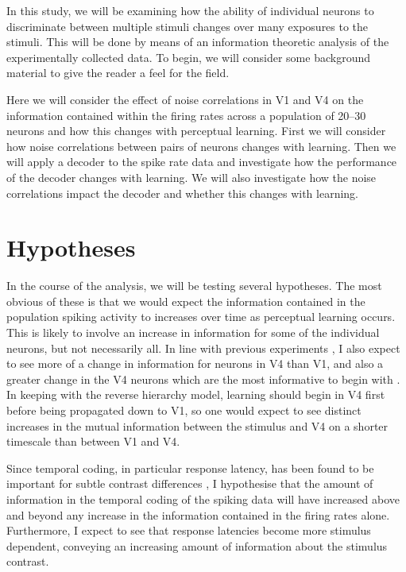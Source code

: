 In this study, we will be examining how the ability of individual neurons to discriminate between multiple stimuli changes over many exposures to the stimuli.
This will be done by means of an information theoretic analysis of the experimentally collected data.
To begin, we will consider some background material to give the reader a feel for the field.

Here we will consider the effect of noise correlations in \ac{V1} and \ac{V4} on the information contained within the firing rates across a population of 20--30 neurons and how this changes with perceptual learning.
First we will consider how noise correlations between pairs of neurons changes with learning.
Then we will apply a decoder to the spike rate data and investigate how the performance of the decoder changes with learning.
We will also investigate how the noise correlations impact the decoder and whether this changes with learning.


\section{Hypotheses}

In the course of the analysis, we will be testing several hypotheses.
The most obvious of these is that we would expect the information contained in the population spiking activity to increases over time as perceptual learning occurs.
This is likely to involve an increase in information for some of the individual neurons, but not necessarily all.
In line with previous experiments \cite{Raiguel2006}, I also expect to see more of a change in information for neurons in \ac{V4} than \ac{V1}, and also a greater change in the \ac{V4} neurons which are the most informative to begin with \cite{Raiguel2006}.
In keeping with the reverse hierarchy model, learning should begin in \ac{V4} first before being propagated down to \ac{V1}, so one would expect to see distinct increases in the mutual information between the stimulus and \ac{V4} on a shorter timescale than between \ac{V1} and \ac{V4}.

Since temporal coding, in particular response latency, has been found to be important for subtle contrast differences \cite{Reich2001,Arabzadeh2006}, I hypothesise that the amount of information in the temporal coding of the spiking data will have increased above and beyond any increase in the information contained in the firing rates alone.
Furthermore, I expect to see that response latencies become more stimulus dependent, conveying an increasing amount of information about the stimulus contrast.

